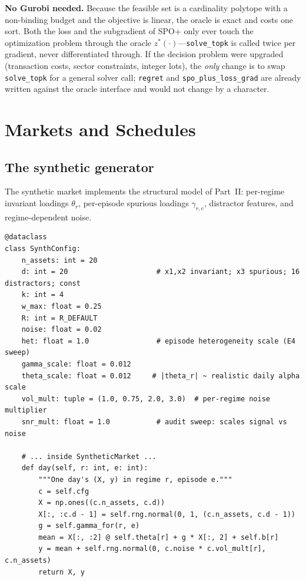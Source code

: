 \documentclass[11pt,a4paper]{article}
\theoremstyle{definition}
\theoremstyle{plain}
\begin{document}
\begin{keypoint}
\textbf{No Gurobi needed.} Because the feasible set is a cardinality
polytope with a non-binding budget and the objective is linear, the oracle
is exact and costs one sort. Both the loss and the subgradient of SPO+ only
ever touch the optimization problem through the oracle
$z^*(\cdot)$---\texttt{solve\_topk} is called twice per gradient, never
differentiated through. If the decision problem were upgraded (transaction
costs, sector constraints, integer lots), the \emph{only} change is to swap
\texttt{solve\_topk} for a general solver call; \texttt{regret} and
\texttt{spo\_plus\_loss\_grad} are already written against the oracle
interface and would not change by a character.
\end{keypoint}


\section{Markets and Schedules}
\label{sec:dd6-markets}

\subsection{The synthetic generator}
\label{sec:dd6-synth}

The synthetic market implements the structural model of Part~II: per-regime
invariant loadings $\theta_r$, per-episode spurious loadings
$\gamma_{r,e}$, distractor features, and regime-dependent noise.

\begin{lstlisting}[caption={\texttt{SynthConfig} and the day generator (\texttt{risp.py}).},label={lst:dd6-synth}]
@dataclass
class SynthConfig:
    n_assets: int = 20
    d: int = 20                     # x1,x2 invariant; x3 spurious; 16 distractors; const
    k: int = 4
    w_max: float = 0.25
    R: int = R_DEFAULT
    noise: float = 0.02
    het: float = 1.0                # episode heterogeneity scale (E4 sweep)
    gamma_scale: float = 0.012
    theta_scale: float = 0.012     # |theta_r| ~ realistic daily alpha scale
    vol_mult: tuple = (1.0, 0.75, 2.0, 3.0)  # per-regime noise multiplier
    snr_mult: float = 1.0           # audit sweep: scales signal vs noise

    # ... inside SyntheticMarket ...
    def day(self, r: int, e: int):
        """One day's (X, y) in regime r, episode e."""
        c = self.cfg
        X = np.ones((c.n_assets, c.d))
        X[:, :c.d - 1] = self.rng.normal(0, 1, (c.n_assets, c.d - 1))
        g = self.gamma_for(r, e)
        mean = X[:, :2] @ self.theta[r] + g * X[:, 2] + self.b[r]
        y = mean + self.rng.normal(0, c.noise * c.vol_mult[r], c.n_assets)
        return X, y
\end{lstlisting}
\end{document}
